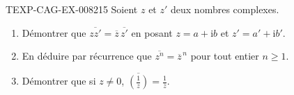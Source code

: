 \begin{exercice}{TEXP-CAG-EX-008}{2}{15}
Soient $z$ et $z'$ deux nombres complexes.
\begin{enumerate}
  \item Démontrer que $\overline{zz'}=\overline{z}\,\overline{z'}$ en posant
        $z=a+\mathrm{i}b$ et $z'=a'+\mathrm{i}b'$.
  \item En déduire par récurrence que $\overline{z^n}=\overline{z}^{\,n}$ pour
        tout entier $n\geq1$.
  \item Démontrer que si $z\neq0$, $\overline{\left(\frac{1}{z}\right)}
        =\frac{1}{\overline{z}}$.
\end{enumerate}
\end{exercice}

